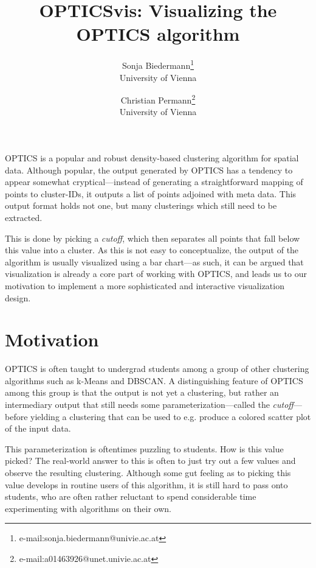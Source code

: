 \documentclass{vgtc} %
\title{OPTICSvis: Visualizing the OPTICS algorithm}
\author{Sonja Biedermann\thanks{e-mail:sonja.biedermann@univie.ac.at }\\ %
\scriptsize University of Vienna %
\and Christian Permann\thanks{e-mail:a01463926@unet.univie.ac.at}\\ %
\scriptsize University of Vienna}
\begin{document}


\maketitle


OPTICS is a popular and robust density-based clustering algorithm for spatial
data. Although popular, the output generated by OPTICS has a tendency to appear
somewhat cryptical---instead of generating a straightforward mapping of points
to cluster-IDs, it outputs a list of points adjoined with meta data. This output
format holds not one, but many clusterings which still need to be extracted.

This is done by picking a \emph{cutoff}, which then separates all points that
fall below this value into a cluster. As this is not easy to conceptualize, the
output of the algorithm is usually visualized using a bar chart---as such, it
can be argued that visualization is already a core part of working with
OPTICS, and leads us to our motivation to implement a more sophisticated and
interactive visualization design.

\section{Motivation} %

OPTICS is often taught to undergrad students among a group of other clustering
algorithms such as k-Means and DBSCAN. A distinguishing feature of OPTICS among
this group is that the output is not yet a clustering, but rather an
intermediary output that still needs some parameterization---called the
\emph{cutoff}---before yielding a clustering that can be used to e.g. produce
a colored scatter plot of the input data.

This parameterization is oftentimes puzzling to students. How is this value
picked? The real-world answer to this is often to just try out a few values and
observe the resulting clustering. Although some gut feeling as to picking this
value develops in routine users of this algorithm, it is still hard to pass
onto students, who are often rather reluctant to spend considerable time
experimenting with algorithms on their own.
\end{document}
